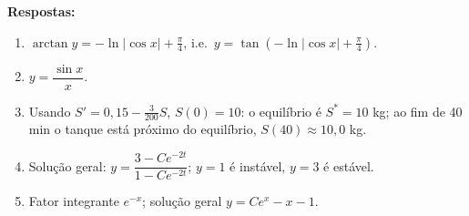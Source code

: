 \documentclass[12pt, a4paper]{article}
\begin{document}
\medskip
\noindent\textbf{Respostas:}
\begin{enumerate}
  \item $\arctan y = -\ln|\cos x| + \tfrac{\pi}{4}$, i.e.\
        $y=\tan\!\left(-\ln|\cos x|+\tfrac{\pi}{4}\right)$.
  \item $y = \dfrac{\sin x}{x}$.
  \item Usando $S' = 0{,}15 - \tfrac{3}{200}S$, $S(0)=10$: o equilíbrio é
        $S^{*}=10$ kg; ao fim de 40 min o tanque está próximo do equilíbrio,
        $S(40)\approx 10{,}0$ kg.
  \item Solução geral: $y = \dfrac{3 - Ce^{-2t}}{1 - Ce^{-2t}}$;
        $y=1$ é instável, $y=3$ é estável.
  \item Fator integrante $e^{-x}$; solução geral $y = Ce^x - x - 1$.
\end{enumerate}
\end{document}
